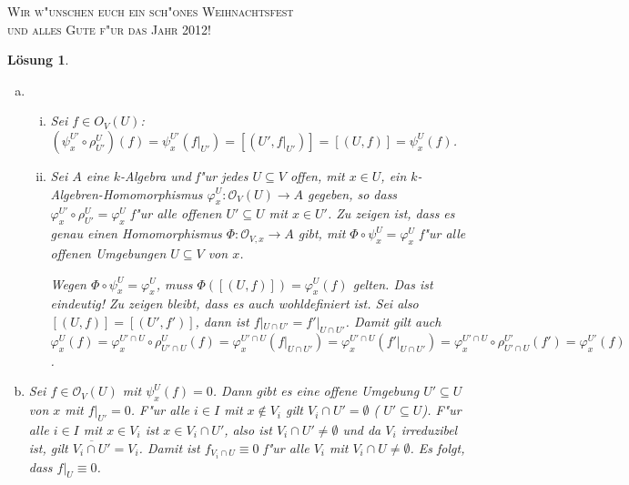 \documentclass[a4paper, 12pt, numbers=noendperiod, chapterprefix=true, headsepline]{scrbook}
\theoremstyle{break}
\newtheorem{Loes}{L\"osung}
\theoremstyle{nonumberbreak}
\theoremstyle{nonumberplain}
\newcommand{\calO}{\mathcal{O}}
\begin{document}
\begin{center}

\vspace{5mm}
\textsc{\Large Wir w"unschen euch ein sch"ones Weihnachtsfest \\[1ex]
und alles Gute f"ur das Jahr 2012!
}
\end{center}

\begin{Loes}\begin{enumerate}[a)]
\item
	\begin{enumerate}[i)]
	\item
		Sei $f \in O_V(U)$: $(\psi_x^{U'} \circ \rho^U_{U'})(f) = \psi_x^{U'}(f|_{U'}) = [(U', f|_{U'})] = [(U,f)] = \psi_x^U(f)$. 
	\item
		Sei $A$ eine $k$-Algebra und f"ur jedes $U \subseteq V$ offen, mit $x \in U$, ein $k$-Algebren-Homomorphismus $\varphi_x^U\colon \calO_V(U) \to A$ gegeben, so dass $\varphi_x^{U'} \circ \rho^U_{U'} = \varphi_x^U$ f"ur alle offenen $U' \subseteq U$ mit $x \in U'$. Zu zeigen ist, dass es genau einen Homomorphismus $\Phi : \calO_{V,x} \to A$ gibt, mit $\Phi \circ \psi_x^U = \varphi_x^U$ f"ur alle offenen Umgebungen $U \subseteq V$ von $x$.

		Wegen $\Phi \circ \psi_x^U = \varphi_x^U$, muss $\Phi([(U,f)]) = \varphi_x^U(f)$ gelten. Das ist eindeutig! Zu zeigen bleibt, dass es auch wohldefiniert ist. Sei also $[(U,f)] = [(U', f')]$, dann ist $f|_{U \cap U'} = f'|_{U \cap U'}$. Damit gilt auch $\varphi_x^U(f) = \varphi_x^{U'\cap U} \circ \rho^U_{U'\cap U} (f) = \varphi_x^{U'\cap U}(f|_{U \cap U'}) = \varphi_x^{U'\cap U}(f'|_{U \cap U'}) = \varphi_x^{U'\cap U} \circ \rho^{U'}_{U'\cap U}(f') = \varphi_x^{U'}(f)$.
	\end{enumerate}
\item
	Sei $f \in \calO_V(U)$ mit $\psi_x^U(f) = 0$. Dann gibt es eine offene Umgebung $U' \subseteq U$ von $x$ mit $f|_{U'} = 0$. F"ur alle $i \in I$ mit $x \notin V_i$ gilt $V_i \cap U' = \emptyset$ ( $U' \subseteq U$). F"ur alle $i \in I$ mit $x \in V_i$ ist $x \in V_i \cap U'$, also ist $V_i \cap U' \neq \emptyset$ und da $V_i$ irreduzibel ist, gilt $\overline{V_i \cap U'} = V_i$. Damit ist $f_{V_i \cap U} \equiv 0$ f"ur alle $V_i$ mit $V_i \cap U \neq \emptyset$. Es folgt, dass $f|_U \equiv 0$. 
\end{enumerate}\end{Loes}
\end{document}
